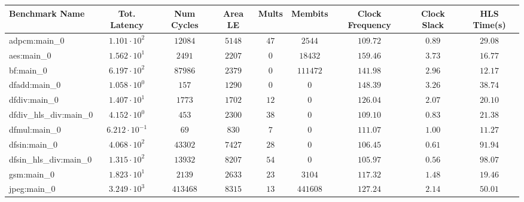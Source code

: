 \begin{tabular}{|l|c|c|c|c|c|c|c|c|}
\hline
Benchmark Name          & Tot. Latency            & Num Cycles & Area LE   & Mults   & Membits    & Clock Frequency & Clock Slack & HLS Time(s) \\
\hline
adpcm:main\_0           & $ 1.101 \cdot 10^{2}  $ & $ 12084  $ & $ 5148  $ & $ 47  $ & $ 2544   $ & $ 109.72      $ & $ 0.89    $ & $ 29.08   $ \\
aes:main\_0             & $ 1.562 \cdot 10^{1}  $ & $ 2491   $ & $ 2207  $ & $ 0   $ & $ 18432  $ & $ 159.46      $ & $ 3.73    $ & $ 16.77   $ \\
bf:main\_0              & $ 6.197 \cdot 10^{2}  $ & $ 87986  $ & $ 2379  $ & $ 0   $ & $ 111472 $ & $ 141.98      $ & $ 2.96    $ & $ 12.17   $ \\
dfadd:main\_0           & $ 1.058 \cdot 10^{0}  $ & $ 157    $ & $ 1290  $ & $ 0   $ & $ 0      $ & $ 148.39      $ & $ 3.26    $ & $ 38.74   $ \\
dfdiv:main\_0           & $ 1.407 \cdot 10^{1}  $ & $ 1773   $ & $ 1702  $ & $ 12  $ & $ 0      $ & $ 126.04      $ & $ 2.07    $ & $ 20.10   $ \\
dfdiv\_hls\_div:main\_0 & $ 4.152 \cdot 10^{0}  $ & $ 453    $ & $ 2300  $ & $ 38  $ & $ 0      $ & $ 109.10      $ & $ 0.83    $ & $ 21.38   $ \\
dfmul:main\_0           & $ 6.212 \cdot 10^{-1} $ & $ 69     $ & $ 830   $ & $ 7   $ & $ 0      $ & $ 111.07      $ & $ 1.00    $ & $ 11.27   $ \\
dfsin:main\_0           & $ 4.068 \cdot 10^{2}  $ & $ 43302  $ & $ 7427  $ & $ 28  $ & $ 0      $ & $ 106.45      $ & $ 0.61    $ & $ 91.94   $ \\
dfsin\_hls\_div:main\_0 & $ 1.315 \cdot 10^{2}  $ & $ 13932  $ & $ 8207  $ & $ 54  $ & $ 0      $ & $ 105.97      $ & $ 0.56    $ & $ 98.07   $ \\
gsm:main\_0             & $ 1.823 \cdot 10^{1}  $ & $ 2139   $ & $ 2633  $ & $ 23  $ & $ 3104   $ & $ 117.32      $ & $ 1.48    $ & $ 19.46   $ \\
jpeg:main\_0            & $ 3.249 \cdot 10^{3}  $ & $ 413468 $ & $ 8315  $ & $ 13  $ & $ 441608 $ & $ 127.24      $ & $ 2.14    $ & $ 50.01   $ \\

\end{tabular}

